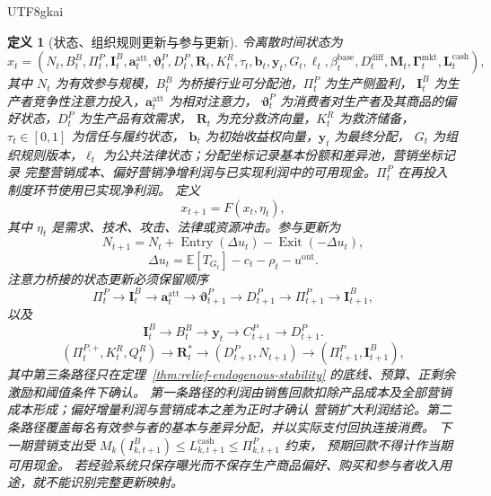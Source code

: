 \documentclass[12pt,a4paper,openany]{report}
\newtheorem{definition}{定义}[chapter]
\newcommand{\EE}{\mathbb E}
\begin{document}
\begin{CJK*}{UTF8}{gkai}
\begin{definition}[状态、组织规则更新与参与更新]
令离散时间状态为
\[
  x_t=(N_t,B_t^B,\Pi_t^P,\mathbf I_t^B,
  \mathbf a_t^{\mathrm{att}},\boldsymbol\vartheta_t^P,D_t^P,
  \mathbf R_t,K_t^R,\tau_t,\mathbf b_t,\mathbf y_t,G_t,\ell_t,
  \beta_t^{\mathrm{base}},D_t^{\mathrm{diff}},\mathbf M_t,
  \boldsymbol\Gamma_t^{\mathrm{mkt}},\mathbf L_t^{\mathrm{cash}}),
\]
其中 \(N_t\) 为有效参与规模，\(B_t^B\) 为桥接行业可分配池，\(\Pi_t^P\) 为生产侧盈利，
\(\mathbf I_t^B\) 为生产者竞争性注意力投入，\(\mathbf a_t^{\mathrm{att}}\) 为相对注意力，
\(\boldsymbol\vartheta_t^P\) 为消费者对生产者及其商品的偏好状态，\(D_t^P\) 为生产品有效需求，
\(\mathbf R_t\) 为充分救济向量，\(K_t^R\) 为救济储备，\(\tau_t\in[0,1]\) 为信任与履约状态，
\(\mathbf b_t\) 为初始收益权向量，\(\mathbf y_t\) 为最终分配，
\(G_t\) 为组织规则版本，\(\ell_t\) 为公共法律状态；分配坐标记录基本份额和差异池，营销坐标记录
完整营销成本、偏好营销净增利润与已实现利润中的可用现金。\(\Pi_t^P\) 在再投入制度环节使用已实现净利润。
定义
\[
  x_{t+1}=F(x_t,\eta_t),
\]
其中 \(\eta_t\) 是需求、技术、攻击、法律或资源冲击。参与更新为
\[
  N_{t+1}
  =
  N_t+\operatorname{Entry}(\Delta u_t)
  -\operatorname{Exit}(-\Delta u_t),
\]
\[
  \Delta u_t
  =
  \EE[T_{G_t}]-c_t-\rho_t-u^{\mathrm{out}}.
\]
注意力桥接的状态更新必须保留顺序
\[
  \Pi_t^P\to\mathbf I_t^B\to\mathbf a_t^{\mathrm{att}}
  \to\boldsymbol\vartheta_{t+1}^P\to D_{t+1}^P
  \to\Pi_{t+1}^P\to\mathbf I_{t+1}^B,
\]
以及
\[
  \mathbf I_t^B\to B_t^B\to\mathbf y_t
  \to C_{t+1}^P\to D_{t+1}^P.
\]
\[
  (\Pi_t^{P,+},K_t^R,Q_t^R)
  \to\mathbf R_t^*
  \to(D_{t+1}^P,N_{t+1})
  \to(\Pi_{t+1}^P,\mathbf I_{t+1}^B),
\]
其中第三条路径只在定理~\ref{thm:relief-endogenous-stability} 的底线、预算、正剩余激励和阈值条件下确认。
第一条路径的利润由销售回款扣除产品成本及全部营销成本形成；偏好增量利润与营销成本之差为正时才确认
营销扩大利润结论。第二条路径覆盖每名有效参与者的基本与差异分配，并以实际支付回执连接消费。
下一期营销支出受 \(M_k(I_{k,t+1}^B)\le L_{k,t+1}^{\mathrm{cash}}\le\Pi_{k,t+1}^P\) 约束，
预期回款不得计作当期可用现金。
若经验系统只保存曝光而不保存生产商品偏好、购买和参与者收入用途，就不能识别完整更新映射。
\end{definition}


\end{CJK*}
\end{document}

